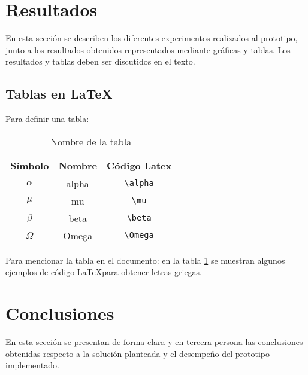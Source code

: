 \section{Resultados}
En esta sección se describen los diferentes experimentos realizados al prototipo, junto a los resultados obtenidos representados mediante gráficas y tablas. Los resultados y tablas deben ser discutidos en el texto. 
\subsection{Tablas en \LaTeX}
Para definir una tabla:

\begin{table}[H]
\centering
\caption{Nombre de la tabla}
\label{table1}
\begin{tabular}{c c c}\hline\hline
\textbf{Símbolo} & \textbf{Nombre} & \textbf{Código Latex}\\ \hline
$\alpha$ & alpha & \verb|\alpha| \\
$\mu$ & mu & \verb|\mu|\\
$\beta$ & beta & \verb|\beta|\\
$\Omega$ & Omega & \verb|\Omega| \\\hline \hline
\end{tabular}
\end{table}
Para mencionar la tabla en el documento: en la tabla \ref{table1} se muestran algunos ejemplos de código \LaTeX para obtener letras griegas.
\section{Conclusiones}
En esta sección se presentan de forma clara y en tercera persona las conclusiones obtenidas respecto a la solución planteada y el desempeño del prototipo implementado.
